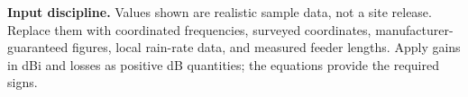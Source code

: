 \begin{notebox}
\textbf{Input discipline.} Values shown are realistic sample data, not a site
release. Replace them with coordinated frequencies, surveyed coordinates,
manufacturer-guaranteed figures, local rain-rate data, and measured feeder lengths.
Apply gains in dBi and losses as positive dB quantities; the equations provide the
required signs.
\end{notebox}
